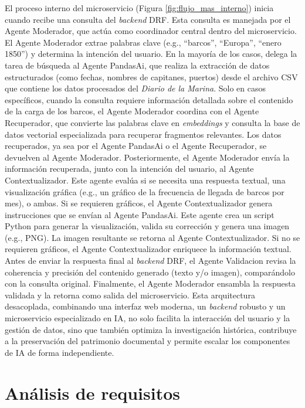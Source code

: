 El proceso interno del microservicio (Figura \ref{fig:flujo_mas_interno}) inicia cuando recibe una consulta del \textit{backend} DRF. Esta consulta es manejada por el Agente Moderador, que actúa como coordinador central dentro del microservicio. El Agente Moderador extrae palabras clave (e.g., “barcos”, “Europa”, “enero 1850”) y determina la intención del usuario. En la mayoría de los casos, delega la tarea de búsqueda al Agente PandasAi, que realiza la extracción de datos estructurados (como fechas, nombres de capitanes, puertos) desde el archivo CSV que contiene los datos procesados del \textit{Diario de la Marina}. Solo en casos específicos, cuando la consulta requiere información detallada sobre el contenido de la carga de los barcos, el Agente Moderador coordina con el Agente Recuperador, que convierte las palabras clave en \textit{embeddings} y consulta la base de datos vectorial especializada para recuperar fragmentos relevantes. Los datos recuperados, ya sea por el Agente PandasAi o el Agente Recuperador, se devuelven al Agente Moderador.
Posteriormente, el Agente Moderador envía la información recuperada, junto con la intención del usuario, al Agente Contextualizador. Este agente evalúa si se necesita una respuesta textual, una visualización gráfica (e.g., un gráfico de la frecuencia de llegada de barcos por mes), o ambas. Si se requieren gráficos, el Agente Contextualizador genera instrucciones que se envían al Agente PandasAi. Este agente crea un script Python para generar la visualización, valida su corrección y genera una imagen (e.g., PNG). La imagen resultante se retorna al Agente Contextualizador. Si no se requieren gráficos, el Agente Contextualizador enriquece la información textual. Antes de enviar la respuesta final al \textit{backend} DRF, el Agente Validacion revisa la coherencia y precisión del contenido generado (texto y/o imagen), comparándolo con la consulta original. Finalmente, el Agente Moderador ensambla la respuesta validada y la retorna como salida del microservicio.
Esta arquitectura desacoplada, combinando una interfaz web moderna, un \textit{backend} robusto y un microservicio especializado en IA, no solo facilita la interacción del usuario y la gestión de datos, sino que también optimiza la investigación histórica, contribuye a la preservación del patrimonio documental y permite escalar los componentes de IA de forma independiente.


\section{Análisis de requisitos}

